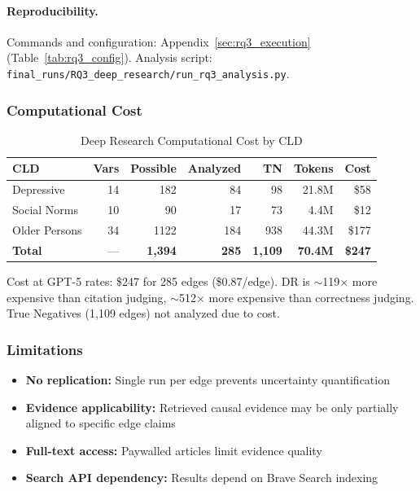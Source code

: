 \paragraph{Reproducibility.}
Commands and configuration: Appendix~\ref{sec:rq3_execution} (Table~\ref{tab:rq3_config}). Analysis script: \texttt{final\_runs/RQ3\_deep\_research/run\_rq3\_analysis.py}.

\subsubsection{Computational Cost}

\begin{table}[H]
\centering
\caption{Deep Research Computational Cost by CLD}
\label{tab:dr_cost}
\footnotesize
\begin{tabular}{@{}l r r r r r r@{}}
\toprule
\textbf{CLD} & \textbf{Vars} & \textbf{Possible} & \textbf{Analyzed} & \textbf{TN} & \textbf{Tokens} & \textbf{Cost} \\
\midrule
Depressive & 14 & 182 & 84 & 98 & 21.8M & \$58 \\
Social Norms & 10 & 90 & 17 & 73 & 4.4M & \$12 \\
Older Persons & 34 & 1122 & 184 & 938 & 44.3M & \$177 \\
\midrule
\textbf{Total} & --- & \textbf{1,394} & \textbf{285} & \textbf{1,109} & \textbf{70.4M} & \textbf{\$247} \\
\bottomrule
\end{tabular}
\end{table}

Cost at GPT-5 rates: \$247 for 285 edges (\$0.87/edge). DR is $\sim$119$\times$ more expensive than citation judging, $\sim$512$\times$ more expensive than correctness judging. True Negatives (1,109 edges) not analyzed due to cost.

\subsubsection{Limitations}

\begin{itemize}[noitemsep]
    \item \textbf{No replication:} Single run per edge prevents uncertainty quantification
    \item \textbf{Evidence applicability:} Retrieved causal evidence may be only partially aligned to specific edge claims
    \item \textbf{Full-text access:} Paywalled articles limit evidence quality
    \item \textbf{Search API dependency:} Results depend on Brave Search indexing
\end{itemize}

